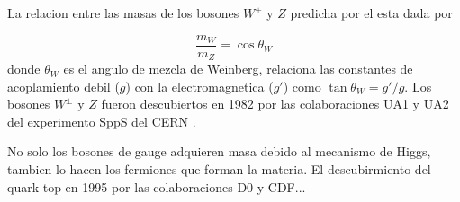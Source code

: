 La relacion entre las masas de los bosones $W^\pm$ y $Z$ predicha por el {\SM} esta dada por

\begin{equation}
  \frac{m_W}{m_Z} = \cos \theta_W
\end{equation}
%
donde $\theta_W$ es el angulo de mezcla de Weinberg, relaciona las constantes de acoplamiento
debil ($g$) con la electromagnetica ($g'$) como  $\tan\theta_W = g'/g$.
Los bosones $W^\pm$ y $Z$ fueron descubiertos en 1982 por las colaboraciones UA1 y UA2 del
experimento SppS del CERN .

No solo los bosones de gauge adquieren masa debido al mecanismo de Higgs, tambien lo hacen
los fermiones que forman la materia. El descubirmiento del quark top en 1995 por las colaboraciones
D0 y CDF... 










